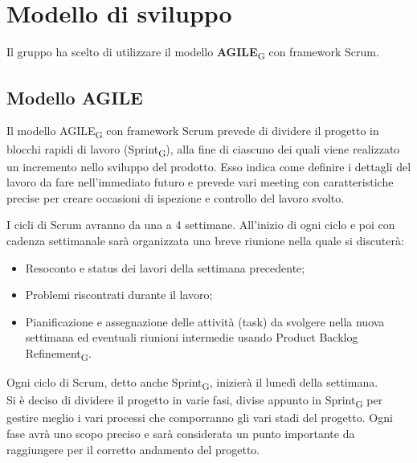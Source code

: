 \section{Modello di sviluppo}
Il gruppo ha scelto di utilizzare il modello \textbf{AGILE}\textsubscript{G} con framework Scrum.

\subsection{Modello AGILE}
Il modello AGILE\textsubscript{G} con framework Scrum prevede di dividere il progetto in blocchi rapidi di lavoro (Sprint\textsubscript{G}),
alla fine di ciascuno dei quali viene realizzato un incremento nello sviluppo del prodotto. 
Esso indica come definire i dettagli del lavoro da fare nell'immediato futuro e prevede 
vari meeting con caratteristiche precise per creare occasioni di ispezione e controllo del lavoro svolto.

I cicli di Scrum avranno da una a 4 settimane. All'inizio di ogni ciclo e poi con cadenza settimanale sarà organizzata una breve riunione nella quale si discuterà:
\begin{itemize}
	\item Resoconto e status dei lavori della settimana precedente;
	\item Problemi riscontrati durante il lavoro;
	\item Pianificazione e assegnazione delle attività (task) da svolgere nella nuova settimana ed eventuali riunioni intermedie usando Product Backlog Refinement\textsubscript{G}.
\end{itemize}
Ogni ciclo di Scrum, detto anche Sprint\textsubscript{G}, inizierà il lunedì della settimana.\\
Si è deciso di dividere il progetto in varie fasi, divise appunto in Sprint\textsubscript{G} per gestire meglio i vari processi che comporranno gli vari stadi del progetto. Ogni fase avrà uno scopo preciso e sarà considerata un punto importante da raggiungere per il corretto andamento del progetto.
